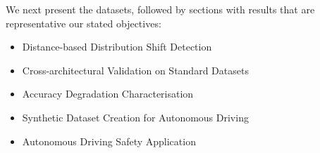 We next present the datasets, followed by sections with results that are representative our stated objectives:

\begin{itemize}

\item Distance-based Distribution Shift Detection
\item Cross-architectural Validation on Standard Datasets
\item Accuracy Degradation Characterisation
\item Synthetic Dataset Creation for Autonomous Driving
\item Autonomous Driving Safety Application
\end{itemize}


